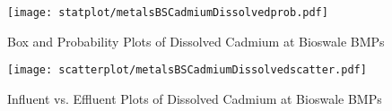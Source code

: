        \begin{figure}[hb]   %
            \centering
            \texttt{[image: statplot/metalsBSCadmiumDissolvedprob.pdf]}
            \caption{Box and Probability Plots of Dissolved Cadmium at Bioswale BMPs}
        \end{figure}         %
        
        
        \begin{figure}[hb]   %
            \centering
            \texttt{[image: scatterplot/metalsBSCadmiumDissolvedscatter.pdf]}
            \caption{Influent vs. Effluent Plots of Dissolved Cadmium at Bioswale BMPs}
        \end{figure}         %
        \clearpage
        